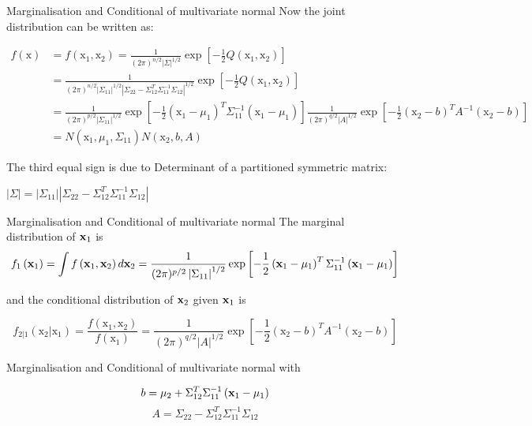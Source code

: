 \documentclass{beamer}
\begin{document}
\begin{frame}{Marginalisation and Conditional of multivariate normal}
	Now the joint distribution can be written as: 
	
	$$\begin{aligned} f(\mathrm{x}) &=f\left(\mathrm{x}_{1}, \mathrm{x}_{2}\right)=\frac{1}{(2 \pi)^{n / 2}\vert\Sigma\vert^{1 / 2}} \exp \left[-\frac{1}{2} Q\left(\mathrm{x}_{1}, \mathrm{x}_{2}\right)\right] \\ &=\frac{1}{(2 \pi)^{n / 2}\left|\Sigma_{11}\right|^{1 / 2}\left|\Sigma_{22}-\Sigma_{12}^{T} \Sigma_{11}^{-1} \Sigma_{12}\right|^{1 / 2}} \exp \left[-\frac{1}{2} Q\left(\mathrm{x}_{1}, \mathrm{x}_{2}\right)\right] \\ &=\frac{1}{(2 \pi)^{p / 2}\left|\Sigma_{11}\right|^{1 / 2}} \exp \left[-\frac{1}{2}\left(\mathrm{x}_{1}-\mu_{1}\right)^{T} \Sigma_{11}^{-1}\left(\mathrm{x}_{1}-\mu_{1}\right)\right] \frac{1}{(2 \pi)^{q / 2}|A|^{1 / 2}} \exp \left[-\frac{1}{2}\left(\mathrm{x}_{2}-b\right)^{T} A^{-1}\left(\mathrm{x}_{2}-b\right)\right] \\ &=N\left(\mathrm{x}_{1}, \mu_{1}, \Sigma_{11}\right) N\left(\mathrm{x}_{2}, b, A\right) \end{aligned}$$
	
	The third equal sign is due to Determinant of a partitioned symmetric matrix:
	
	$|\Sigma|=\left|\Sigma_{11}\right|\left|\Sigma_{22}-\Sigma_{12}^{T} \Sigma_{11}^{-1} \Sigma_{12}\right|$
\end{frame}

\begin{frame}{Marginalisation and Conditional of multivariate normal}
	The marginal distribution of $\mathbf{x}_1$ is 
	$$f_{1}\left(\mathbf{x}_{1}\right)=\int f\left(\mathbf{x}_{1}, \mathbf{x}_{2}\right) d \mathbf{x}_{2}=\frac{1}{(2 \pi)^{p / 2}\left|\Sigma_{11}\right|^{1 / 2}} \exp \left[-\frac{1}{2}\left(\mathbf{x}_{1}-\mu_{1}\right)^{T} \Sigma_{11}^{-1}\left(\mathbf{x}_{1}-\mu_{1}\right)\right]$$
	
	and the conditional distribution of $\mathbf{x}_2$ given $\mathbf{x}_1$ is 
	
	$$f_{2 | 1}\left(\mathrm{x}_{2} | \mathrm{x}_{1}\right)=\frac{f\left(\mathrm{x}_{1}, \mathrm{x}_{2}\right)}{f\left(\mathrm{x}_{1}\right)}=\frac{1}{(2 \pi)^{q / 2}|A|^{1 / 2}} \exp \left[-\frac{1}{2}\left(\mathrm{x}_{2}-b\right)^{T} A^{-1}\left(\mathrm{x}_{2}-b\right)\right]$$
\end{frame}

\begin{frame}{Marginalisation and Conditional of multivariate normal}
	with
	
	$$b=\mu_{2}+\Sigma_{12}^{T} \Sigma_{11}^{-1}\left(\mathbf{x}_{1}-\mu_{1}\right)$$
	\[
	A=\Sigma_{22}-\Sigma_{12}^{T} \Sigma_{11}^{-1} \Sigma_{12}
	\]
\end{frame}

%
%
\end{document}
